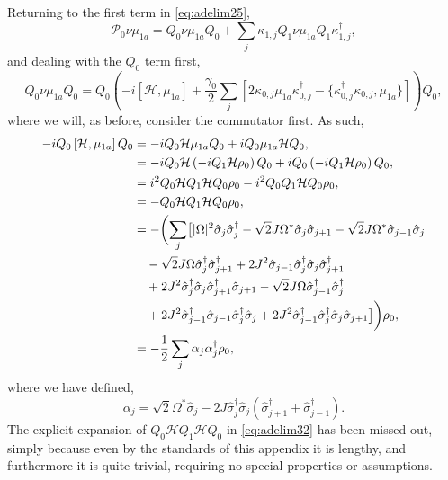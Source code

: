 Returning to the first term in \cref{eq:adelim25},
\begin{equation}
	\mathcal{P}_{0}\nu\mu_{1a} = Q_{0}\nu\mu_{1a}Q_{0} + \sum_{j}\kappa_{1,j}Q_{1}\nu\mu_{1a}Q_{1}\kappa_{1,j}^{\dagger}, 
	\label{eq:adelim30}
\end{equation}
and dealing with the \(Q_{0}\) term first,
\begin{equation}
	Q_{0}\nu\mu_{1a}Q_{0} = Q_{0}\left( -i\left[ \mathcal{H}, \mu_{1a} \right] + \frac{\gamma_{0}}{2} \sum_{j}\left[2\kappa_{0,j}\mu_{1a}\kappa_{0,j}^{\dagger} - \{\kappa_{0,j}^{\dagger}\kappa_{0,j}, \mu_{1a}\} \right] \right)Q_{0},
	\label{eq:adelim31}
\end{equation}
where we will, as before, consider the commutator first. As such,
\begin{align}
	-iQ_{0}\left[\mathcal{H}, \mu_{1a} \right]Q_{0} &= -iQ_{0}\mathcal{H}\mu_{1a}Q_{0} + iQ_{0}\mu_{1a}\mathcal{H}Q_{0}, \notag \\
	&=-iQ_{0}\mathcal{H}\left( -iQ_{1}\mathcal{H}\rho_{0} \right)Q_{0} + iQ_{0}\left( -iQ_{1}\mathcal{H}\rho_{0} \right)Q_{0}, \notag \\
	&= i^{2}Q_{0}\mathcal{H}Q_{1}\mathcal{H}Q_{0}\rho_{0} - i^{2}Q_{0}Q_{1}\mathcal{H}Q_{0}\rho_{0}, \notag \\
	&= -Q_{0}\mathcal{H}Q_{1}\mathcal{H}Q_{0}\rho_{0}, \notag \\
	&= -\biggl(\sum_{j} \bigl[ |\Omega|^{2}\hat{\sigma}_{j}\hat{\sigma}_{j}^{\dagger} - \sqrt{2}J\Omega^{*}\hat{\sigma}_{j}\hat{\sigma}_{j+1} - \sqrt{2}J\Omega^{*}\hat{\sigma}_{j-1}\hat{\sigma}_{j} \notag \\ 
	&\quad - \sqrt{2}J\Omega\hat{\sigma}_{j}^{\dagger}\hat{\sigma}_{j+1}^{\dagger} + 2J^{2}\hat{\sigma}_{j-1}\hat{\sigma}_{j}^{\dagger}\hat{\sigma}_{j}\hat{\sigma}_{j+1}^{\dagger} \notag \\ 
	&\quad + 2J^{2}\hat{\sigma}_{j}^{\dagger}\hat{\sigma}_{j}\hat{\sigma}_{j+1}^{\dagger}\hat{\sigma}_{j+1} - \sqrt{2}J\Omega\hat{\sigma}_{j-1}^{\dagger}\hat{\sigma}_{j}^{\dagger} \notag \\ 
	&\quad + 2J^{2}\hat{\sigma}_{j-1}^{\dagger}\hat{\sigma}_{j-1}\hat{\sigma}_{j}^{\dagger}\hat{\sigma}_{j} + 2J^{2}\hat{\sigma}_{j-1}^{\dagger}\hat{\sigma}_{j}^{\dagger}\hat{\sigma}_{j}\hat{\sigma}_{j+1} \bigr] \biggr)\rho_{0}, \notag \\
	&= -\frac{1}{2} \sum_{j} \alpha_{j}\alpha_{j}^{\dagger}\rho_{0},
	\label{eq:adelim32}
\end{align}
where we have defined,
\begin{equation}
	\alpha_{j} = \sqrt{2}\Omega^{*}\hat{\sigma}_{j} - 2J\hat{\sigma}_{j}^{\dagger}\hat{\sigma}_{j}\left(\hat{\sigma}_{j+1}^{\dagger} + \hat{\sigma}_{j-1}^{\dagger}\right).
	\label{eq:adelim33}
\end{equation}
The explicit expansion of \(Q_{0}\mathcal{H}Q_{1}\mathcal{H}Q_{0}\) in \cref{eq:adelim32} has been missed out, simply because even by the standards of this appendix it is lengthy, and furthermore it is quite trivial, requiring no special properties or assumptions.

